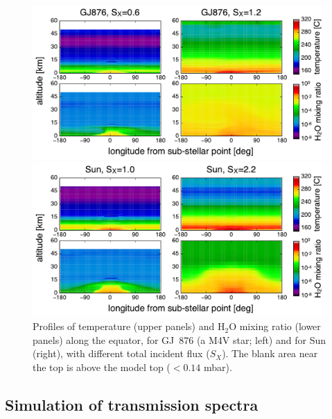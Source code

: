 \documentclass[11pt,numberedappendix,twocolappendix,]{emulateapj}
\def\water{H$_2$O }
\newcommand{\dsa}[1]{{\color{blue}#1}}
\begin{document}
\begin{figure}[tb]
    \begin{minipage}{0.5\hsize}
\includegraphics[width=\hsize]{fig/AqOH0TLS_GJ876_temp_xH2O.pdf}
    \end{minipage}
    \begin{minipage}{0.5\hsize}
\includegraphics[width=\hsize]{fig/AqOH0TLS_Sun_temp_xH2O.pdf}
    \end{minipage}
    \caption{Profiles of temperature (upper panels) and \water mixing ratio (lower panels) along the equator, for GJ~876 (a M4V star; left) and for Sun (right), with different total incident flux ($S_X$). The blank area near the top is above the model top \dsa{($< 0.14$ mbar)}.}
\label{fig:3Dprofile_equator}
\end{figure}


\subsection{Simulation of transmission spectra}
\label{ss:method_TransmissionSpectra}
\end{document}
